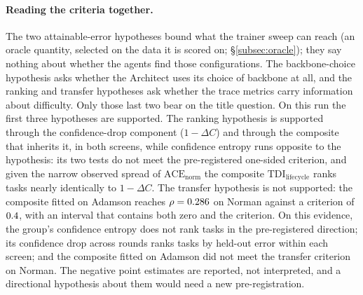 \documentclass[10pt,a4paper]{article}
\begin{document}
\paragraph{Reading the criteria together.} The two attainable-error hypotheses
bound what the trainer sweep can reach (an oracle quantity, selected on the data
it is scored on; \S\ref{subsec:oracle}); they say
nothing about whether the agents find those configurations. The backbone-choice
hypothesis asks whether the Architect uses its choice of backbone at all, and the
ranking and transfer hypotheses ask whether the trace metrics carry information
about difficulty. Only those last two bear on the title question. On this run the
first three hypotheses are supported. The
ranking hypothesis is supported through the confidence-drop component
($1-\Delta C$) and through the composite that inherits it, in both screens, while
confidence entropy runs opposite to the hypothesis: its two tests do not meet the
pre-registered one-sided criterion, and given the narrow observed spread of
$\mathrm{ACE}_{\mathrm{norm}}$ the composite $\mathrm{TDI}_{\mathrm{lifecycle}}$
ranks tasks nearly identically to $1-\Delta C$. The transfer hypothesis is not
supported: the composite fitted on Adamson reaches $\rho=0.286$ on Norman
against a criterion of $0.4$, with an interval that contains both
zero and the criterion. On this evidence, the group's confidence entropy does not
rank tasks in the pre-registered direction; its confidence drop across rounds ranks
tasks by held-out error within each screen; and the composite fitted on Adamson did
not meet the transfer criterion on Norman. The negative point estimates are
reported, not interpreted, and a directional hypothesis about them would need a new
pre-registration.
\end{document}
